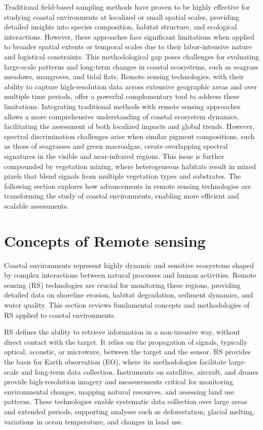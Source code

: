 \documentclass[
  letterpaper,
  11pt,
  english,
  singlespacing,
  headsepline]{MastersDoctoralThesis}
\begin{document}
\begin{spacing}{1.5}
\begin{tcolorbox}
Traditional field-based sampling methods have proven to be highly effective for studying coastal environments at localized or small spatial scales, providing detailed insights into species composition, habitat structure, and ecological interactions. However, these approaches face significant limitations when applied to broader spatial extents or temporal scales due to their labor-intensive nature and logistical constraints. This methodological gap poses challenges for evaluating large-scale patterns and long-term changes in coastal ecosystems, such as seagrass meadows, mangroves, and tidal flats. Remote sensing technologies, with their ability to capture high-resolution data across extensive geographic areas and over multiple time periods, offer a powerful complementary tool to address these limitations. Integrating traditional methods with remote sensing approaches allows a more comprehensive understanding of coastal ecosystem dynamics, facilitating the assessment of both localized impacts and global trends. However, spectral discrimination challenges arise when similar pigment compositions, such as those of seagrasses and green macroalgae, create overlapping spectral signatures in the visible and near-infrared regions. This issue is further compounded by vegetation mixing, where heterogeneous habitats result in mixed pixels that blend signals from multiple vegetation types and substrates. The following section explores how advancements in remote sensing technologies are transforming the study of coastal environments, enabling more efficient and scalable assessments.
\end{tcolorbox}

\section{Concepts of Remote sensing}\label{concepts-of-remote-sensing}

Coastal environments represent highly dynamic and sensitive ecosystems
shaped by complex interactions between natural processes and human
activities. Remote sensing (RS) technologies are crucial for monitoring
these regions, providing detailed data on shoreline erosion, habitat
degradation, sediment dynamics, and water quality. This section reviews
fundamental concepts and methodologies of RS applied to coastal
environments.

RS defines the ability to retrieve information in a non-invasive way,
without direct contact with the target. It relies on the propagation of
signals, typically optical, acoustic, or microwave, between the target
and the sensor. RS provides the basis for Earth observation (EO), where
its methodologies facilitate large-scale and long-term data collection.
Instruments on satellites, aircraft, and drones provide high-resolution
imagery and measurements critical for monitoring environmental changes,
mapping natural resources, and assessing land use patterns. These
technologies enable systematic data collection over large areas and
extended periods, supporting analyses such as deforestation, glacial
melting, variations in ocean temperature, and changes in land use.


\end{spacing}
\end{document}
